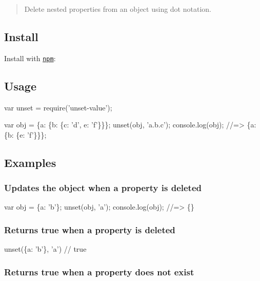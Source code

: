 \begin{quote}
Delete nested properties from an object using dot notation. \end{quote}


\subsection*{Install}

Install with \href{https://www.npmjs.com/}{\tt npm}\+:




\subsection*{Usage}


\begin{DoxyCode}
var unset = require('unset-value');

var obj = \{a: \{b: \{c: 'd', e: 'f'\}\}\};
unset(obj, 'a.b.c');
console.log(obj);
//=> \{a: \{b: \{e: 'f'\}\}\};
\end{DoxyCode}


\subsection*{Examples}

\subsubsection*{Updates the object when a property is deleted}


\begin{DoxyCode}
var obj = \{a: 'b'\};
unset(obj, 'a');
console.log(obj);
//=> \{\}
\end{DoxyCode}


\subsubsection*{Returns true when a property is deleted}


\begin{DoxyCode}
unset(\{a: 'b'\}, 'a') // true
\end{DoxyCode}


\subsubsection*{Returns {\ttfamily true} when a property does not exist}

